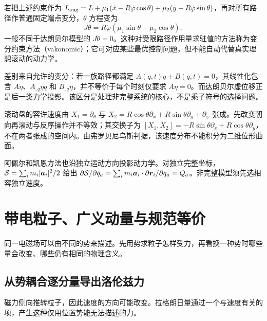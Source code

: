 若把上述约束作为 $L_{\rm aug}=L+\mu_1(\dot x-R\dot\varphi\cos\theta)+\mu_2(\dot y-R\dot\varphi\sin\theta)$，再对所有路径作普通固定端点变分，$\theta$ 方程变为
\[
J\ddot\theta=R\dot\varphi(\mu_1\sin\theta-\mu_2\cos\theta),
\]
一般不同于达朗贝尔模型的 $J\ddot\theta=0$。这种对受限路径作用量求驻值的方法称为变分约束方法（vakonomic）；它可对应某些最优控制问题，但不能自动代替真实理想滚动的动力学。

差别来自允许的变分：若一族路径都满足 $A(q,t)\dot q+B(q,t)=0$，其线性化包含 $A\dot\eta$、$A_{,q}\eta\dot q$ 和 $B_{,q}\eta$，并不等价于每个时刻仅要求 $A\eta=0$。而达朗贝尔虚位移正是后一类力学投影。该区分是处理非完整系统的核心，不是乘子符号的选择问题。

\begin{modernbox}[title={进一步探索：不可积性与工程多体方法}]
滚动盘的容许速度由 $X_1=\partial_\theta$ 与 $X_2=R\cos\theta\partial_x+R\sin\theta\partial_y+\partial_\varphi$ 张成。先改变朝向再滚动与反序操作并不等效；其交换子为 $[X_1,X_2]=-R\sin\theta\partial_x+R\cos\theta\partial_y$，不在两者张成的空间内。由弗罗贝尼乌斯判据，该速度分布不能积分为二维位形曲面。

阿佩尔和凯恩方法也沿独立运动方向投影动力学。对独立完整坐标，$\mathcal S=\sum_i m_i|\boldsymbol{a}_i|^2/2$ 给出 $\partial\mathcal S/\partial\ddot q_a=\sum_i m_i\boldsymbol{a}_i\cdot\partial\boldsymbol{r}_i/\partial q_a=Q_a$。非完整模型须先选相容独立速度。
\end{modernbox}

\section{带电粒子、广义动量与规范等价}
同一电磁场可以由不同的势来描述。先用势求粒子怎样受力，再看换一种势时哪些量会改变、哪些仍有相同的物理含义。

\subsection{从势耦合逐分量导出洛伦兹力}
磁力侧向推转粒子，因此速度的方向可能改变。拉格朗日量通过一个与速度有关的项，产生这种仅用位置势能无法描述的力。


